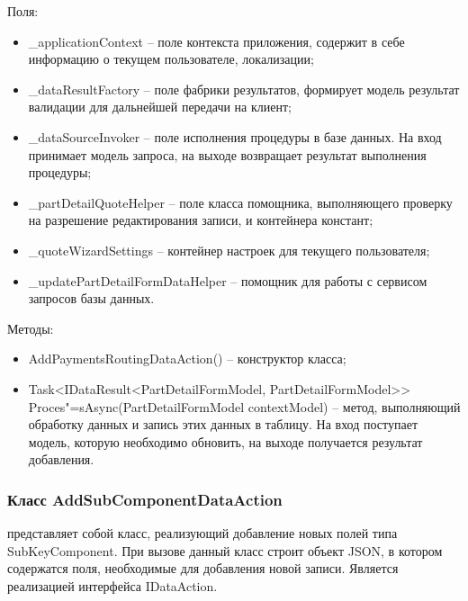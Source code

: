 Поля:
\begin{itemize}
  \item \_applicationContext – поле контекста приложения, содержит в себе информацию о текущем пользователе, локализации;
  \item \_dataResultFactory – поле фабрики результатов, формирует модель результат валидации для дальнейшей передачи на клиент;
  \item \_dataSourceInvoker – поле исполнения процедуры в базе данных. На вход принимает модель запроса, на выходе возвращает результат выполнения процедуры;
  \item \_partDetailQuoteHelper – поле класса помощника, выполняющего проверку на разрешение редактирования записи, и контейнера констант;
  \item \_quoteWizardSettings – контейнер настроек для текущего пользователя;
  \item \_updatePartDetailFormDataHelper – помощник для работы с сервисом запросов базы данных.
\end{itemize}

Методы:
\begin{itemize}
  \item AddPaymentsRoutingDataAction() – конструктор класса;
  \item Task<IDataResult<PartDetailFormModel, PartDetailFormModel>> Proces"=sAsync(PartDetailFormModel contextModel) – метод, выполняющий обработку данных и запись этих данных в таблицу. На вход поступает модель, которую необходимо обновить, на выходе получается результат добавления.
\end{itemize}

\subsubsection{Класс AddSubComponentDataAction }
\label{sub:arch_and_mod:data_layer:add_sub_component}

представляет собой класс, реализующий добавление новых полей типа SubKeyComponent. При вызове данный класс строит объект JSON, в котором содержатся поля, необходимые для добавления новой записи. Является реализацией интерфейса IDataAction.

